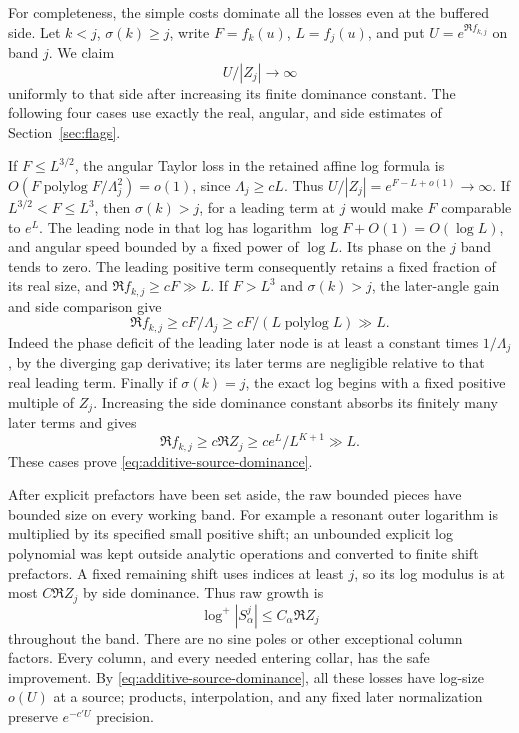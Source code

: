 For completeness, the simple costs dominate all the losses even at
the buffered side.  Let $k<j$, $\sigma(k)\ge j$, write
$F=f_k(u)$, $L=f_j(u)$, and put $U=e^{\Re f_{k,j}}$ on band $j$.
We claim
\begin{equation}\label{eq:additive-source-dominance}
 U/|Z_j|\longrightarrow\infty
\end{equation}
uniformly to that side after increasing its finite dominance constant.
The following four cases use exactly the real, angular, and side
estimates of Section~\ref{sec:flags}.

If $F\le L^{3/2}$, the angular Taylor loss in the retained affine log
formula is
$O(F\operatorname{polylog}F/\Lambda_j^2)=o(1)$, since
$\Lambda_j\ge cL$.  Thus
$U/|Z_j|=e^{F-L+o(1)}\to\infty$.
If $L^{3/2}<F\le L^3$, then $\sigma(k)>j$, for a leading term at $j$
would make $F$ comparable to $e^L$.  The leading node in that log has
logarithm $\log F+O(1)=O(\log L)$, and angular speed bounded by a
fixed power of $\log L$.  Its phase on the $j$ band tends to zero.
The leading positive term consequently retains a fixed fraction of
its real size, and $\Re f_{k,j}\ge cF\gg L$.
If $F>L^3$ and $\sigma(k)>j$, the later-angle gain and side comparison
give
\[
 \Re f_{k,j}\ge cF/\Lambda_j
       \ge cF/(L\operatorname{polylog}L)\gg L.
\]
Indeed the phase deficit of the leading later node is at least a
constant times $1/\Lambda_j$, by the diverging gap derivative;
its later terms are negligible relative to that real leading term.
Finally if $\sigma(k)=j$, the exact log begins with a fixed positive
multiple of $Z_j$.  Increasing the side dominance constant absorbs
its finitely many later terms and gives
\[
 \Re f_{k,j}\ge c\Re Z_j
       \ge c e^L/L^{K+1}\gg L.
\]
These cases prove \eqref{eq:additive-source-dominance}.

After explicit prefactors have been set aside, the raw bounded pieces
have bounded size on every working band.  For example a resonant outer
logarithm is multiplied by its specified small positive shift; an
unbounded explicit log polynomial was kept outside analytic
operations and converted to finite shift prefactors.  A fixed remaining
shift uses indices at least $j$, so its log modulus is at most
$C\Re Z_j$ by side dominance.  Thus raw growth is
\begin{equation}\label{eq:additive-raw-growth}
 \log^+|S^j_\alpha|\le C_\alpha\Re Z_j
\end{equation}
throughout the band.  There are no sine poles or other exceptional
column factors.  Every column, and every needed entering collar, has
the safe improvement.  By \eqref{eq:additive-source-dominance}, all
these losses have log-size $o(U)$ at a source; products, interpolation,
and any fixed later normalization preserve $e^{-c'U}$ precision.

